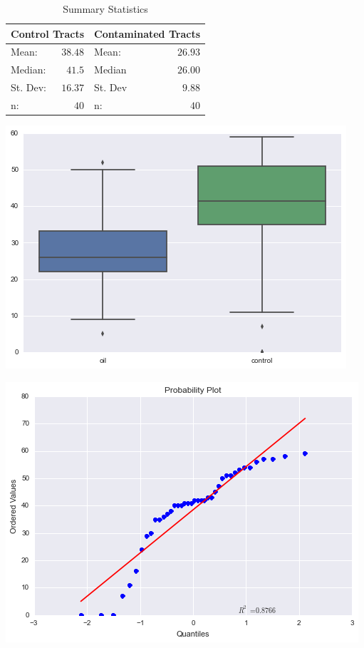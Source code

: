 \documentclass[twoside]{article}
\begin{document}
\begin{multicols}{2}
\begin{table}[H]
	\caption{Summary Statistics}
	\centering
	\begin{tabular}{lr|lr}
		\toprule
		\multicolumn{2}{c}{Control Tracts} & \multicolumn{2}{c}{Contaminated Tracts} \\
		\midrule
		Mean: & $38.48$ & Mean: & $26.93$ \\
		Median: & $41.5$ & Median & $26.00$ \\
		St. Dev: & $16.37$ & St. Dev & $9.88$ \\
		n: & $40$ & n: & $40$ \\
		\bottomrule
	\end{tabular}
\end{table}

\includegraphics[scale=0.35]{output_5_1}

\includegraphics[scale=0.35]{output_7_0}


\end{multicols}
\end{document}
